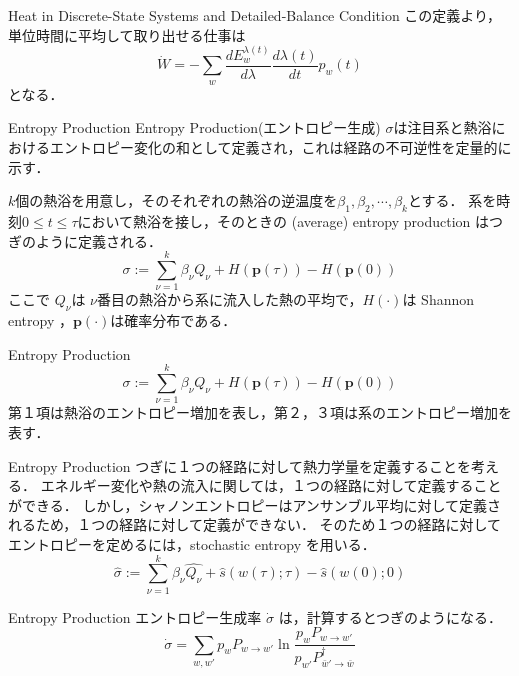 \documentclass[aspectratio=169, dvipdfmx, 11pt,uplatex]{beamer} %
\begin{document}
\begin{frame}{Heat in Discrete-State Systems and Detailed-Balance Condition}
  この定義より，単位時間に平均して取り出せる仕事は
  \begin{equation}
    \dot{W} = - \sum_w \frac{d E_w^{\lambda(t)}}{d \lambda} \frac{d \lambda(t)}{dt} p_w (t)
  \end{equation}
  となる．
\end{frame}

\begin{frame}{Entropy Production}
  Entropy Production(エントロピー生成) $\sigma $は注目系と熱浴におけるエントロピー変化の和として定義され，これは経路の不可逆性を定量的に示す．\par 
  $k$個の熱浴を用意し，そのそれぞれの熱浴の逆温度を$\beta_1, \beta_2, \cdots, \beta_k$とする．
  系を時刻$0 \leqslant t \leqslant  \tau $において熱浴を接し，そのときの (average) entropy production はつぎのように定義される．
  \begin{equation}
    \sigma := \sum_{\nu=1}^k \beta_{\nu } Q_{\nu } + H(\mathbf{p}(\tau )) - H(\mathbf{p}(0))
  \end{equation}
  ここで $Q_{\nu }$は $\nu $番目の熱浴から系に流入した熱の平均で，$H(\cdot )$は Shannon entropy ，$\mathbf{p}(\cdot )$は確率分布である．
\end{frame}

\begin{frame}{Entropy Production}
  \begin{equation}
    \sigma := \sum_{\nu=1}^k \beta_{\nu } Q_{\nu } + H(\mathbf{p}(\tau )) - H(\mathbf{p}(0))
  \end{equation}
  第１項は熱浴のエントロピー増加を表し，第２，３項は系のエントロピー増加を表す．
\end{frame}

\begin{frame}{Entropy Production}
  つぎに１つの経路に対して熱力学量を定義することを考える．
  エネルギー変化や熱の流入に関しては，１つの経路に対して定義することができる．
  しかし，シャノンエントロピーはアンサンブル平均に対して定義されるため，１つの経路に対して定義ができない．
  そのため１つの経路に対してエントロピーを定めるには，stochastic entropy を用いる．
  \begin{equation}
    \hat{\sigma } := \sum_{\nu=1}^k \beta_{\nu } \hat{Q_{\nu }} + \hat{s} (w(\tau ); \tau ) - \hat{s} (w(0 ); 0)
  \end{equation}
\end{frame}

\begin{frame}{Entropy Production}
  エントロピー生成率 $\dot{\sigma }$ は，計算するとつぎのようになる．
  \begin{equation}
    \dot{\sigma } = \sum_{w, w'} p_w P_{w \to w'} \ln \frac{p_w P_{w \to w'}}{p_{w'} P^{\dagger }_{\bar{w}' \to \bar{w}}}
  \end{equation}
\end{frame}
\end{document}
